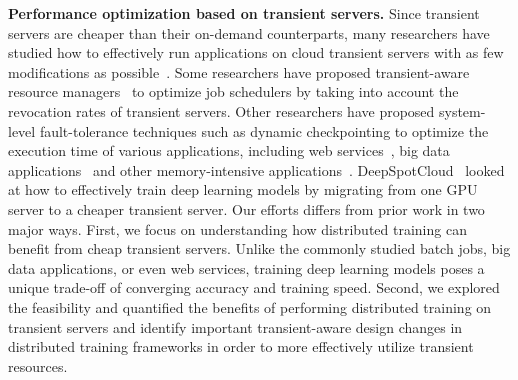 \textbf{Performance optimization based on transient servers.} Since transient
servers are cheaper than their on-demand counterparts, many researchers have studied how to
effectively run applications on cloud transient servers with as few
modifications as possible~\cite{hotspot,spotcheck}. Some researchers have proposed
transient-aware resource managers~\cite{portfolio-driven,proteus} to optimize
job schedulers by taking into account the revocation rates of transient
servers. Other researchers have proposed system-level fault-tolerance techniques
such as dynamic checkpointing to optimize the execution time of various
applications, including web services~\cite{spotcheck,tributary}, big data
applications~\cite{See_spotrun,Flint,Tr-spark,spoton} and other
memory-intensive applications~\cite{spot_burstable}. 
DeepSpotCloud~\cite{deepspotcloud} looked at how to effectively train deep
learning models by migrating from one GPU server to a cheaper transient
server. Our efforts differs from prior work in two major ways. First, we focus on
understanding how distributed training can benefit from cheap transient
servers. Unlike the commonly studied batch jobs, big data applications, or
even web services, training deep learning models poses a unique trade-off of
converging accuracy and training speed. Second, we explored the feasibility and
quantified the benefits of performing distributed training on transient servers
and identify important transient-aware design changes in distributed training
frameworks in order to more effectively utilize transient resources. 
